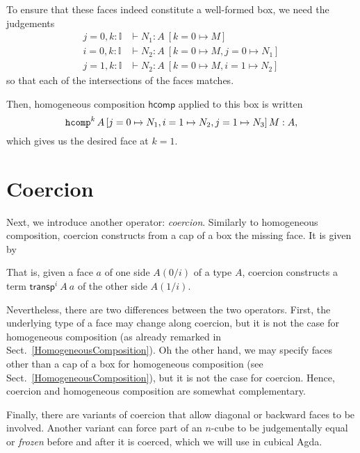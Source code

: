 \documentclass[11pt]{article}
\begin{document}
To ensure that these faces indeed constitute a well-formed box, we need the judgements 
\begin{align*}
j = 0, k : \mathbb{I} &\vdash N_1 : A \ [k = 0 \mapsto M] \\
i = 0, k : \mathbb{I} &\vdash N_2 : A \ [k = 0 \mapsto M, j = 0 \mapsto N_1] \\
j = 1, k : \mathbb{I} &\vdash N_2 : A \ [k = 0 \mapsto M, i = 1 \mapsto N_2] 
\end{align*}
so that each of the intersections of the faces matches. 

Then, homogeneous composition $\mathsf{hcomp}$ applied to this box is written 
\begin{equation*}
\oftype{\hcomp^k\,A\,[j=0 \mapsto N_1, i=1 \mapsto N_2, j=1 \mapsto N_3]\,M}{A},
\end{equation*}
which gives us the desired face at $k = 1$.





\section{Coercion}
Next, we introduce another operator: \emph{coercion}.
Similarly to homogeneous composition, coercion constructs from a cap of a box the missing face. 
It is given by
\begin{prooftree*}
\end{prooftree*}
That is, given a face $a$ of one side $A(0/i)$ of a type $A$, coercion constructs a term $\mathsf{transp}^i \ A \ a$ of the other side $A(1/i)$.
\fi

Nevertheless, there are two differences between the two operators. 
First, the underlying type of a face may change along coercion, but it is not the case for homogeneous composition (as already remarked in Sect.~\ref{HomogeneousComposition}). 
Oh the other hand, we may specify faces other than a cap of a box for homogeneous composition (see Sect.~\ref{HomogeneousComposition}), but it is not the case for coercion. 
Hence, coercion and homogeneous composition are somewhat complementary. 

Finally, there are variants of coercion that allow diagonal or backward faces to be involved.
Another variant can force part of an $n$-cube to be judgementally equal or \emph{frozen} before and after it is coerced, which we will use in cubical Agda.
\end{document}
